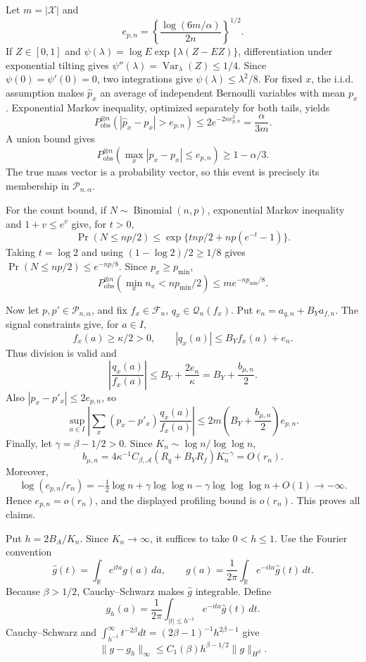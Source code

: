 Let \(m=|\mathcal X|\) and
\[
 e_{p,n}=\left\{\frac{\log(6m/\alpha)}{2n}\right\}^{1/2}.
\]
If \(Z\in[0,1]\) and \(\psi(\lambda)=\log E\exp\{\lambda(Z-EZ)\}\), differentiation under exponential tilting gives \(\psi''(\lambda)=\operatorname{Var}_\lambda(Z)\le1/4\). Since \(\psi(0)=\psi'(0)=0\), two integrations give \(\psi(\lambda)\le\lambda^2/8\). For fixed \(x\), the i.i.d. assumption makes \(\widehat p_x\) an average of independent Bernoulli variables with mean \(p_x\). Exponential Markov inequality, optimized separately for both tails, yields
\[
 P_{\mathrm{obs}}^{\otimes n}(|\widehat p_x-p_x|>e_{p,n})
 \le2e^{-2ne_{p,n}^2}=\frac{\alpha}{3m}.
\]
A union bound gives
\[
 P_{\mathrm{obs}}^{\otimes n}\left(\max_x|\widehat p_x-p_x|\le e_{p,n}\right)\ge1-\alpha/3.
\]
The true mass vector is a probability vector, so this event is precisely its membership in \(\mathcal P_{n,\alpha}\).

For the count bound, if \(N\sim\operatorname{Binomial}(n,p)\), exponential Markov inequality and \(1+v\le e^v\) give, for \(t>0\),
\[
 \Pr(N\le np/2)\le\exp\{tnp/2+np(e^{-t}-1)\}.
\]
Taking \(t=\log2\) and using \((1-\log2)/2\ge1/8\) gives \(\Pr(N\le np/2)\le e^{-np/8}\). Since \(p_x\ge p_{\min}\),
\[
 P_{\mathrm{obs}}^{\otimes n}\left(\min_xn_x<np_{\min}/2\right)
 \le m e^{-np_{\min}/8}.
\]

Now let \(p,p'\in\mathcal P_{n,\alpha}\), and fix \(f_x\in\mathscr F_n\), \(q_x\in\mathscr Q_n(f_x)\). Put \(e_n=a_{q,n}+B_Ya_{f,n}\). The signal constraints give, for \(a\in I\),
\[
 f_x(a)\ge\kappa/2>0,
 \qquad |q_x(a)|\le B_Yf_x(a)+e_n.
\]
Thus division is valid and
\[
 \left|\frac{q_x(a)}{f_x(a)}\right|
 \le B_Y+\frac{2e_n}{\kappa}=B_Y+\frac{b_{\mu,n}}2.
\]
Also \(|p_x-p'_x|\le2e_{p,n}\), so
\[
 \sup_{a\in I}\left|\sum_x(p_x-p'_x)\frac{q_x(a)}{f_x(a)}\right|
 \le2m\left(B_Y+\frac{b_{\mu,n}}2\right)e_{p,n}.
\]
Finally, let \(\gamma=\beta-1/2>0\). Since \(K_n\sim\log n/\log\log n\),
\[
 b_{\mu,n}=4\kappa^{-1}C_{\beta,\mathcal A}(R_q+B_YR_f)K_n^{-\gamma}=O(r_n).
\]
Moreover,
\[
 \log(e_{p,n}/r_n)
 =-\tfrac12\log n+\gamma\log\log n-\gamma\log\log\log n+O(1)\longrightarrow-\infty.
\]
Hence \(e_{p,n}=o(r_n)\), and the displayed profiling bound is \(o(r_n)\). This proves all claims.

Put \(h=2B_A/K_n\). Since \(K_n\to\infty\), it suffices to take \(0<h\le1\). Use the Fourier convention
\[
 \widehat g(t)=\int_{\mathbb R}e^{ita}g(a)\,da,
 \qquad g(a)=\frac1{2\pi}\int_{\mathbb R}e^{-ita}\widehat g(t)\,dt.
\]
Because \(\beta>1/2\), Cauchy--Schwarz makes \(\widehat g\) integrable. Define
\[
 g_h(a)=\frac1{2\pi}\int_{|t|\le h^{-1}}e^{-ita}\widehat g(t)\,dt.
\]
Cauchy--Schwarz and \(\int_{h^{-1}}^\infty t^{-2\beta}dt=(2\beta-1)^{-1}h^{2\beta-1}\) give
\[
 \|g-g_h\|_\infty\le C_1(\beta)h^{\beta-1/2}\|g\|_{H^\beta}.
\]

